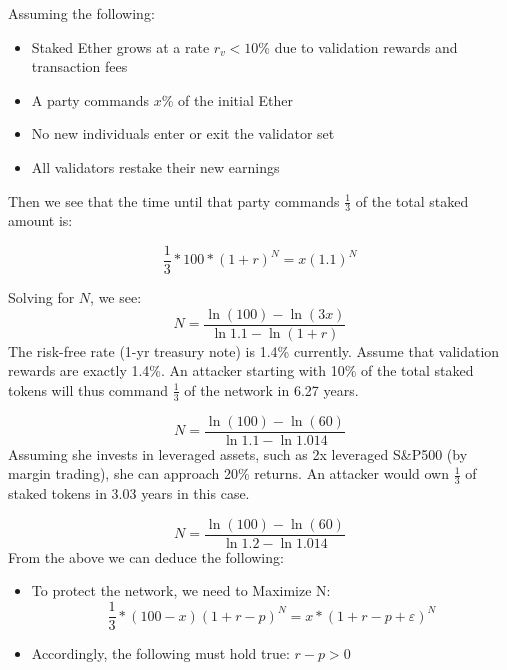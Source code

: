 \documentclass{article}
\renewcommand{\|}{\;|\;}
\begin{document}
Assuming the following: 
\begin{itemize}
\item Staked Ether grows at a rate $r_{v} < 10\%$ due to validation rewards and transaction fees
\item A party commands $x\%$ of the initial Ether
\item No new individuals enter or exit the validator set
\item All validators restake their new earnings
\end{itemize}
Then we see that the time until that party commands $\frac{1}{3}$ of the total staked amount is:

\begin{equation}
\frac{1}{3} * 100 * (1 + r)^N  = x(1.1)^N
\end{equation}

Solving for $N$, we see:
\begin{equation}
N = \frac{\ln{(100)}- \ln{(3x)}}{ \ln{1.1} - \ln{(1+r)}}
\end{equation} \newline The risk-free rate (1-yr treasury note) is 1.4\% currently. Assume that validation rewards are exactly 1.4\%. An attacker starting with 10\% of the total staked tokens will thus command $\frac{1}{3}$ of the network in 6.27 years.

\begin{equation}
    N =  \frac{\ln{(100)} - \ln{(60)}}{\ln{1.1}- \ln{1.014}}
\end{equation} \newline Assuming she invests in leveraged assets, such as 2x leveraged S&P500 (by margin trading), she can approach 20\% returns. An attacker would own $\frac{1}{3}$ of staked tokens in 3.03 years in this case.

\begin{equation}
    N =  \frac{\ln{(100)} - \ln{(60)}}{\ln{1.2}- \ln{1.014}}
\end{equation} \newline From the above we can deduce the following:
\begin{itemize}
  \item To protect the network, we need to Maximize N:
    \begin{equation}
    \frac{1}{3} * (100 - x)(1 + r - p)^N  = x * (1 + r - p + \varepsilon)^N
    \end{equation}
  \item Accordingly, the following must hold true: 
        $r - p > 0$
\end{itemize}
\end{document}
